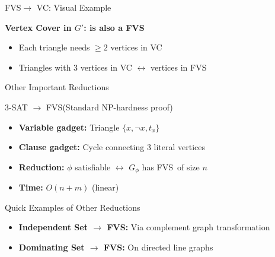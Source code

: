 \documentclass[aspectratio=169]{beamer}
\newcommand{\fvs}{\textsc{FVS}}
\begin{document}
\begin{frame}{\fvs $\rightarrow$ VC: Visual Example}
  \vspace{0.3cm}
	\begin{minipage}{\textwidth}
		\small
		\textbf{Vertex Cover in $G'$: is also a FVS}
	\begin{itemize}
		\item Each triangle needs $\ge 2$ vertices in VC
		\item Triangles with 3 vertices in VC $\leftrightarrow$ vertices in \fvs
	\end{itemize}
	\end{minipage}
\end{frame}

\begin{frame}{Other Important Reductions}
	\begin{block}{3-SAT $\rightarrow$ \fvs (Standard NP-hardness proof)}
    \begin{itemize}
      \item \textbf{Variable gadget:} Triangle $\{x, \neg x, t_x\}$
      \item \textbf{Clause gadget:} Cycle connecting 3 literal vertices
	\item \textbf{Reduction:} $\phi$ satisfiable $\leftrightarrow$ $G_\phi$ has \fvs\ of size $n$
      \item \textbf{Time:} $O(n+m)$ (linear)
    \end{itemize}
  \end{block}
  
  \vspace{0.5cm}
  
  \begin{block}{Quick Examples of Other Reductions}
    \begin{itemize}
	\item \textbf{Independent Set $\rightarrow$ \fvs:} Via complement graph transformation
	\item \textbf{Dominating Set $\rightarrow$ \fvs:} On directed line graphs
    \end{itemize}
  \end{block}
\end{frame}
\end{document}
